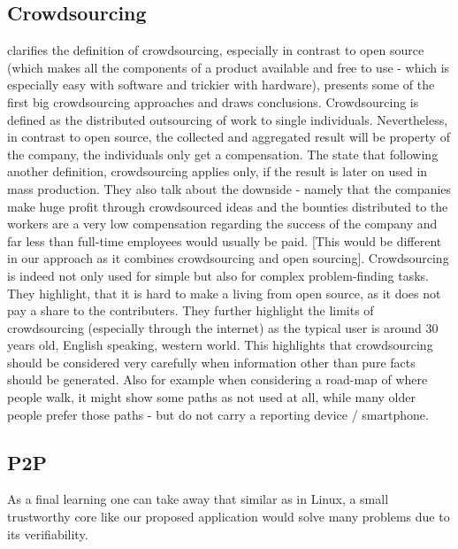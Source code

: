 \subsection{Crowdsourcing}
\parencite{brabham2008crowdsourcing} clarifies the definition of crowdsourcing, especially in contrast to open source (which makes all the components of a product available and free to use - which is especially easy with software and trickier with hardware), presents some of the first big crowdsourcing approaches and draws conclusions. Crowdsourcing is defined as the distributed outsourcing of work to single individuals. Nevertheless, in contrast to open source, the collected and aggregated result will be property of the company, the individuals only get a compensation. The state that following another definition, crowdsourcing applies only, if the result is later on used in mass production. They also talk about the downside - namely that the companies make huge profit through crowdsourced ideas and the bounties distributed to the workers are a very low compensation regarding the success of the company and far less than full-time employees would usually be paid. [This would be different in our approach as it combines crowdsourcing and open sourcing]. Crowdsourcing is indeed not only used for simple but also for complex problem-finding tasks. They highlight, that it is hard to make a living from open source, as it does not pay a share to the contributers. They further highlight the limits of crowdsourcing (especially through the internet) as the typical user is around 30 years old, English speaking, western world. This highlights that crowdsourcing should be considered very carefully when information other than pure facts should be generated. Also for example when considering a road-map of where people walk, it might show some paths as not used at all, while many older people prefer those paths - but do not carry a reporting device / smartphone.

\subsection{P2P}

As a final learning one can take away that similar as in Linux, a small trustworthy core like our proposed application would solve many problems due to its verifiability. 
